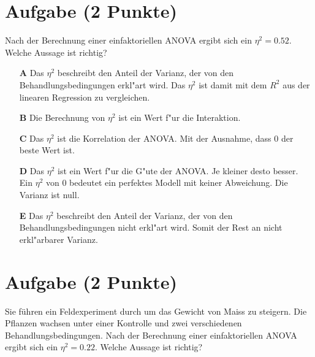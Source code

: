 \documentclass[a4paper, 9pt]{scrartcl}\usepackage[]{graphicx}\usepackage[]{xcolor}
\begin{document}
\section{Aufgabe \hfill (2 Punkte)}





Nach der Berechnung einer einfaktoriellen ANOVA ergibt sich ein $\eta^2 = 0.52$. Welche Aussage ist richtig?



\begin{enumerate}
\item [\textbf{A} \msquare] Das $\eta^2$ beschreibt den Anteil der Varianz, der von den Behandlungsbedingungen erkl{"a}rt wird. Das $\eta^2$ ist damit mit dem $R^2$ aus der linearen Regression zu vergleichen.
\item [\textbf{B} \msquare] Die Berechnung von $\eta^2$ ist ein Wert f{"u}r die Interaktion.
\item [\textbf{C} \msquare] Das $\eta^2$ ist die Korrelation der ANOVA. Mit der Ausnahme, dass 0 der beste Wert ist.
\item [\textbf{D} \msquare] Das $\eta^2$ ist ein Wert f{"u}r die G{"u}te der ANOVA. Je kleiner desto besser. Ein $\eta^2$ von 0 bedeutet ein perfektes Modell mit keiner Abweichung. Die Varianz ist null.
\item [\textbf{E} \msquare] Das $\eta^2$ beschreibt den Anteil der Varianz, der von den Behandlungsbedingungen nicht erkl{"a}rt wird. Somit der Rest an nicht erkl{"a}rbarer Varianz.
\end{enumerate} 

\section{Aufgabe \hfill (2 Punkte)}



Sie führen ein Feldexperiment durch um das Gewicht von Maiss zu
steigern. Die Pflanzen wachsen unter einer Kontrolle und zwei verschiedenen
Behandlungsbedingungen. Nach der Berechnung einer einfaktoriellen ANOVA
ergibt sich ein $\eta^2 = 0.22$. Welche Aussage ist richtig?
\end{document}
